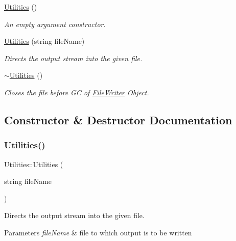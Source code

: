 \begin{DoxyCompactItemize}
\mbox{\label{classUtilities_ab1676c9ce35cf347a73d16f1094e1271}} 
\hyperlink{classUtilities_ab1676c9ce35cf347a73d16f1094e1271}{Utilities} ()
\begin{DoxyCompactList}\small\item\em An empty argument constructor. \end{DoxyCompactList}\item 
\hyperlink{classUtilities_ad25724fc4d9bb458d8e1f09a3b34cdaa}{Utilities} (string file\+Name)
\begin{DoxyCompactList}\small\item\em Directs the output stream into the given file. \end{DoxyCompactList}\item 
\mbox{\label{classUtilities_a4528eb392f63157354077bedabb9663d}} 
\hyperlink{classUtilities_a4528eb392f63157354077bedabb9663d}{$\sim$\+Utilities} ()
\begin{DoxyCompactList}\small\item\em Closes the file before GC of \hyperlink{classFileWriter}{File\+Writer} Object. \end{DoxyCompactList}\end{DoxyCompactItemize}


\subsection{Constructor \& Destructor Documentation}
\mbox{\label{classUtilities_ad25724fc4d9bb458d8e1f09a3b34cdaa}} 
\subsubsection{\texorpdfstring{Utilities()}{Utilities()}}
{\footnotesize\ttfamily Utilities\+::\+Utilities (\begin{DoxyParamCaption}\item[{string}]{file\+Name }\end{DoxyParamCaption})}



Directs the output stream into the given file. 


\begin{DoxyParams}{Parameters}
{\em file\+Name} & file to which output is to be written \\
\hline
\end{DoxyParams}


